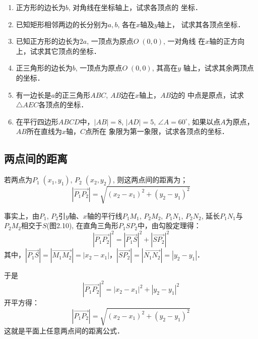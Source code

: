 \begin{ex}
\begin{enumerate}
    \item 正方形的边长为$b$, 对角线在坐标轴上，试求各顶点的
    坐标．
    \item 已知矩形相邻两边的长分别为$a,b$, 各在$x$轴及$y$轴上，
    试求其各顶点坐标．
    \item 已知正方形的边长为$2a$, 一顶点为原点$O\;(0,0)$, 一对角线
    在$x$轴的正方向上，试求其它顶点的坐标．
    \item 正三角形的边长为$b$, 一顶点为原点$O\;(0,0)$, 其高在$y$
    轴上，试求其余两顶点的坐标．
    \item 有一边长是$a$的正三角形$ABC$, $AB$边在$x$轴上，$AB$边的
    中点是原点，试求$\triangle AEC$各顶点的坐标．
    \item 在平行四边形$ABCD$中，$|AB|=8$, $|AD|=5$, $\angle A=
    60^{\circ}$, 如果以点$A$为原点，$AB$所在直线为$x$轴，$C$点所在
    象限为第一象限，试求各顶点的坐标．
\end{enumerate}
\end{ex}

\subsection{两点间的距离}
若两点为$P_1\;(x_1,y_1)$, $P_2\;(x_2,y_2)$, 则这两点间的距离为；
$$|\Vec{P_1P_2}|=\sqrt{(x_2-x_1)^2+(y_2-y_1)^2}$$

\begin{figure}[htp]
    \centering
{}
    \caption{}
\end{figure}



事实上，由$P_1$, $P_2$引$y$轴、$x$轴的平行线$P_1M_1$, $P_2M_2$,
$P_1N_1$, $P_2N_2$, 延长$P_1N_1$与$P_2M_2$相交于$S$(图2.10), 在直角三角形$P_1SP_2$中，由勾股定理得：
\[|\Vec{P_1P_2}|^2=|\Vec{P_1S}|^2+|\Vec{SP_2}|^2 \]
其中，$|\Vec{P_1S}|=|\Vec{M_1M_2}|=|x_2-x_1|$，$|\Vec{SP_2}|=|\Vec{N_1N_2}|=|y_2-y_1|$．

于是$$|\Vec{P_1P_2}|^2=|x_2-x_1|^2+|y_2-y_1|^2$$
开平方得：
$$|\Vec{P_1P_2}|=\sqrt{(x_2-x_1)^2+(y_2-y_1)^2}$$
这就是平面上任意两点间的距离公式．

